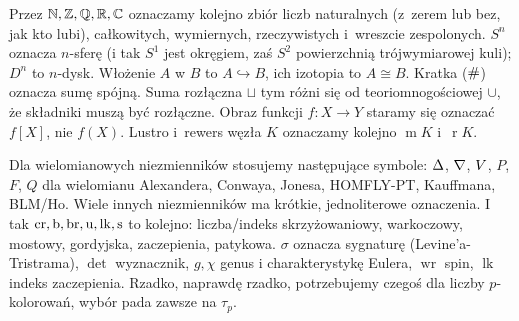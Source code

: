 
Przez $\mathbb N, \mathbb Z, \mathbb Q, \mathbb R, \mathbb C$ oznaczamy kolejno zbiór liczb naturalnych (z~zerem lub bez, jak kto lubi), całkowitych, wymiernych, rzeczywistych i~wreszcie zespolonych.
$S^n$ oznacza $n$-sferę (i tak $S^1$ jest okręgiem, zaś $S^2$ powierzchnią trójwymiarowej kuli); $D^n$ to $n$-dysk.
Włożenie $A$ w $B$ to $A \hookrightarrow B$, ich izotopia to $A \cong B$.
Kratka ($\mathbin{\#}$) oznacza sumę spójną.
Suma rozłączna $\sqcup$ tym różni się od teoriomnogościowej $\cup$, że składniki muszą być rozłączne. Obraz funkcji $f \colon X \to Y$ staramy się oznaczać $f[X]$, nie $f(X)$.
Lustro i~rewers węzła $K$ oznaczamy kolejno $\operatorname{m} K$ i~$\operatorname{r} K$.

Dla wielomianowych niezmienników stosujemy następujące symbole: $\Delta$, $\nabla$, $V$, $P$, $F$, $Q$ dla wielomianu Alexandera, Conwaya, Jonesa, HOMFLY-PT, Kauffmana, BLM/Ho.
Wiele innych niezmienników ma krótkie, jednoliterowe oznaczenia.
I tak $\operatorname{cr}, \operatorname{b}, \operatorname{br}, \operatorname{u}, \operatorname{lk}, \operatorname{s}$ to kolejno: liczba/indeks skrzyżowaniowy, warkoczowy, mostowy, gordyjska, zaczepienia, patykowa.
$\sigma$ oznacza sygnaturę (Levine'a-Tristrama), $\det$ wyznacznik, $g, \chi$ genus i charakterystykę Eulera, $\operatorname{wr}$ spin, $\operatorname{lk}$ indeks zaczepienia.
Rzadko, naprawdę rzadko, potrzebujemy czegoś dla liczby $p$-kolorowań, wybór pada zawsze na $\tau_p$.



